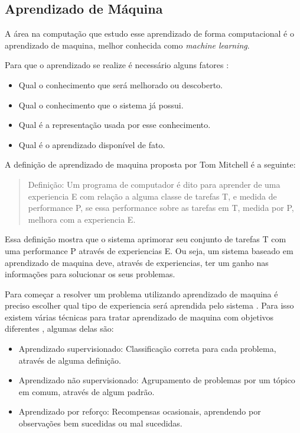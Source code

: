 \subsection{Aprendizado de Máquina} 

A área na computação que estudo esse aprendizado de forma computacional é o aprendizado de maquina, melhor conhecida como \textit{machine learning}. 

Para que o aprendizado se realize é necessário alguns fatores \cite{intelligence2003modern}:
\begin{itemize}
	\item Qual o conhecimento que será melhorado ou descoberto.
	\item Qual o conhecimento que o sistema já possui.
	\item Qual é a representação usada por esse conhecimento.
	\item Qual é o aprendizado disponível de fato.
\end{itemize}

A definição de aprendizado de maquina proposta por Tom Mitchell \cite{Mitchell1997ML} é a seguinte:

 \begin{quote}
 	Definição: Um programa de computador é dito para aprender de uma experiencia E com relação a alguma classe de tarefas T, e medida de performance P, se essa performance sobre as tarefas em T, medida por P, melhora com a experiencia E.
 \end{quote}

Essa definição mostra que o sistema aprimorar seu conjunto de tarefas T com uma performance P através de experiencias E. Ou seja, um sistema baseado em aprendizado de maquina deve, através de experiencias, ter um ganho nas informações para solucionar os seus problemas.  

Para começar a resolver um problema utilizando aprendizado de maquina é preciso escolher qual tipo de experiencia será aprendida pelo sistema \cite{Mitchell1997ML}. 
Para isso existem várias técnicas para tratar aprendizado de maquina com objetivos diferentes \cite{intelligence2003modern}, algumas delas são:

\begin{itemize}
	\item Aprendizado supervisionado: Classificação correta para cada problema, através de alguma definição. 
	\item Aprendizado não supervisionado: Agrupamento de problemas por um tópico em comum, através de algum padrão.
	\item Aprendizado por reforço: Recompensas ocasionais, aprendendo por observações bem sucedidas ou mal sucedidas. 
\end{itemize}

